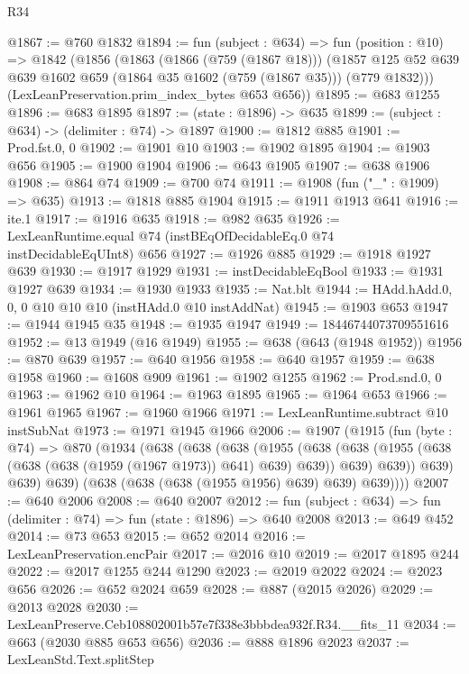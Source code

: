 \begin{lexlean}{R34}
\begin{coremodule}
@1867 := @760 @1832
@1894 := fun (subject : @634) =>
  fun (position : @10) =>
  @1842
    (@1856
      (@1863
        (@1866 (@759 (@1867 @18)))
        (@1857 @125 @52 @639 @639 @1602 @659 (@1864 @35 @1602 (@759 (@1867 @35))) (@779 @1832)))
      (LexLeanPreservation.prim_index_bytes @653 @656))
@1895 := @683 @1255
@1896 := @683 @1895
@1897 := (state : @1896) -> @635
@1899 := (subject : @634) -> (delimiter : @74) -> @1897
@1900 := @1812 @885
@1901 := Prod.fst.{0, 0}
@1902 := @1901 @10
@1903 := @1902 @1895
@1904 := @1903 @656
@1905 := @1900 @1904
@1906 := @643 @1905
@1907 := @638 @1906
@1908 := @864 @74
@1909 := @700 @74
@1911 := @1908 (fun ("_" : @1909) => @635)
@1913 := @1818 @885 @1904
@1915 := @1911 @1913 @641
@1916 := ite.{1}
@1917 := @1916 @635
@1918 := @982 @635
@1926 := LexLeanRuntime.equal @74 (instBEqOfDecidableEq.{0} @74 instDecidableEqUInt8) @656
@1927 := @1926 @885
@1929 := @1918 @1927 @639
@1930 := @1917 @1929
@1931 := instDecidableEqBool
@1933 := @1931 @1927 @639
@1934 := @1930 @1933
@1935 := Nat.blt
@1944 := HAdd.hAdd.{0, 0, 0} @10 @10 @10 (instHAdd.{0} @10 instAddNat)
@1945 := @1903 @653
@1947 := @1944 @1945 @35
@1948 := @1935 @1947
@1949 := 18446744073709551616
@1952 := @13 @1949 (@16 @1949)
@1955 := @638 (@643 (@1948 @1952))
@1956 := @870 @639
@1957 := @640 @1956
@1958 := @640 @1957
@1959 := @638 @1958
@1960 := @1608 @909
@1961 := @1902 @1255
@1962 := Prod.snd.{0, 0}
@1963 := @1962 @10
@1964 := @1963 @1895
@1965 := @1964 @653
@1966 := @1961 @1965
@1967 := @1960 @1966
@1971 := LexLeanRuntime.subtract @10 instSubNat
@1973 := @1971 @1945 @1966
@2006 := @1907
    (@1915
      (fun (byte : @74) =>
      @870
        (@1934
          (@638
            (@638
              (@638
                (@1955
                  (@638
                    (@638 (@1955 (@638 (@638 (@638 (@1959 (@1967 @1973)) @641) @639) @639)) @639)
                    @639))
                @639)
              @639)
            @639)
          (@638 (@638 (@638 (@1955 @1956) @639) @639) @639))))
@2007 := @640 @2006
@2008 := @640 @2007
@2012 := fun (subject : @634) => fun (delimiter : @74) => fun (state : @1896) => @640 @2008
@2013 := @649 @452
@2014 := @73 @653
@2015 := @652 @2014
@2016 := LexLeanPreservation.encPair
@2017 := @2016 @10
@2019 := @2017 @1895 @244
@2022 := @2017 @1255 @244 @1290
@2023 := @2019 @2022
@2024 := @2023 @656
@2026 := @652 @2024 @659
@2028 := @887 (@2015 @2026)
@2029 := @2013 @2028
@2030 := LexLeanPreserve.Ceb108802001b57e7f338e3bbbdea932f.R34.__fits_11
@2034 := @663 (@2030 @885 @653 @656)
@2036 := @888 @1896 @2023
@2037 := LexLeanStd.Text.splitStep

\end{coremodule}
\end{lexlean}
